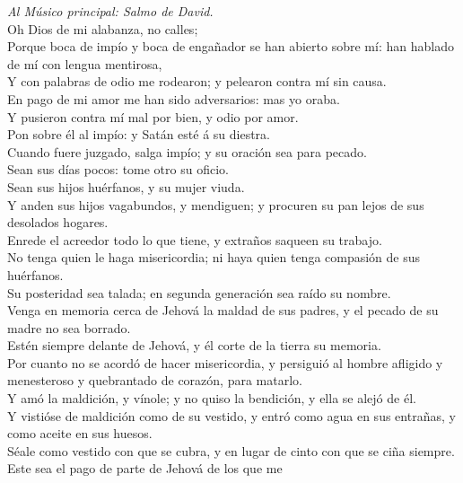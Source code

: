  \emph{Al Músico principal: Salmo de David.}\\
Oh Dios de mi alabanza, no calles;\\
 Porque boca de impío y boca de engañador se han abierto
sobre mí: han hablado de mí con lengua mentirosa,\\
 Y con palabras de odio me rodearon; y pelearon contra mí
sin causa.\\
 En pago de mi amor me han sido adversarios: mas yo oraba.\\
 Y pusieron contra mí mal por bien, y odio por amor.\\
 Pon sobre él al impío: y Satán esté á su diestra.\\
 Cuando fuere juzgado, salga impío; y su oración sea para
pecado.\\
 Sean sus días pocos: tome otro su oficio.\\
 Sean sus hijos huérfanos, y su mujer viuda.\\
 Y anden sus hijos vagabundos, y mendiguen; y procuren su
pan lejos de sus desolados hogares.\\
 Enrede el acreedor todo lo que tiene, y extraños saqueen
su trabajo.\\
 No tenga quien le haga misericordia; ni haya quien tenga
compasión de sus huérfanos.\\
 Su posteridad sea talada; en segunda generación sea raído
su nombre.\\
 Venga en memoria cerca de Jehová la maldad de sus padres,
y el pecado de su madre no sea borrado.\\
 Estén siempre delante de Jehová, y él corte de la tierra
su memoria.\\
 Por cuanto no se acordó de hacer misericordia, y persiguió
al hombre afligido y menesteroso y quebrantado de corazón, para
matarlo.\\
 Y amó la maldición, y vínole; y no quiso la bendición, y
ella se alejó de él.\\
 Y vistióse de maldición como de su vestido, y entró como
agua en sus entrañas, y como aceite en sus huesos.\\
 Séale como vestido con que se cubra, y en lugar de cinto
con que se ciña siempre.\\
 Este sea el pago de parte de Jehová de los que me
